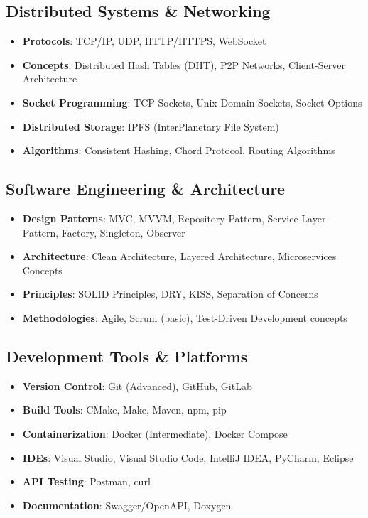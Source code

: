 \documentclass[a4paper,12pt]{article}
\begin{document}
\subsection*{Distributed Systems \& Networking}
\begin{itemize}[nosep,after=\strut, leftmargin=1em, itemsep=1pt]
\item \textbf{Protocols}: TCP/IP, UDP, HTTP/HTTPS, WebSocket
\item \textbf{Concepts}: Distributed Hash Tables (DHT), P2P Networks, Client-Server Architecture
\item \textbf{Socket Programming}: TCP Sockets, Unix Domain Sockets, Socket Options
\item \textbf{Distributed Storage}: IPFS (InterPlanetary File System)
\item \textbf{Algorithms}: Consistent Hashing, Chord Protocol, Routing Algorithms
\end{itemize}

\subsection*{Software Engineering \& Architecture}
\begin{itemize}[nosep,after=\strut, leftmargin=1em, itemsep=1pt]
\item \textbf{Design Patterns}: MVC, MVVM, Repository Pattern, Service Layer Pattern, Factory, Singleton, Observer
\item \textbf{Architecture}: Clean Architecture, Layered Architecture, Microservices Concepts
\item \textbf{Principles}: SOLID Principles, DRY, KISS, Separation of Concerns
\item \textbf{Methodologies}: Agile, Scrum (basic), Test-Driven Development concepts
\end{itemize}

\subsection*{Development Tools \& Platforms}
\begin{itemize}[nosep,after=\strut, leftmargin=1em, itemsep=1pt]
\item \textbf{Version Control}: Git (Advanced), GitHub, GitLab
\item \textbf{Build Tools}: CMake, Make, Maven, npm, pip
\item \textbf{Containerization}: Docker (Intermediate), Docker Compose
\item \textbf{IDEs}: Visual Studio, Visual Studio Code, IntelliJ IDEA, PyCharm, Eclipse
\item \textbf{API Testing}: Postman, curl
\item \textbf{Documentation}: Swagger/OpenAPI, Doxygen
\end{itemize}
\end{document}
